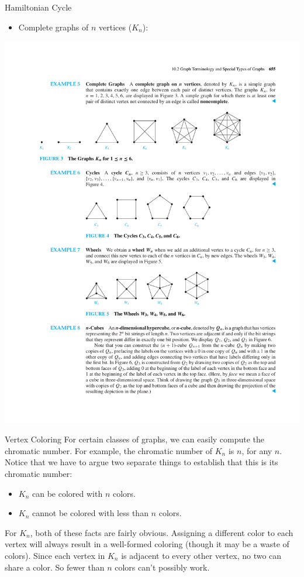 \documentclass{beamer}
\theoremstyle{definition}
\begin{document}
\begin{frame}{Hamiltonian Cycle}
   \begin{itemize}
        \item Complete graphs of $n$ vertices ($K_n$):
    \end{itemize}
    \centering \includegraphics[trim={2cm 20cm 7cm 5cm},clip,width=.9\linewidth]{p655}
\end{frame}

\begin{frame}{Vertex Coloring}
    For certain classes of graphs, we can easily compute the chromatic number. For example, the chromatic number of $K_n$ is $n$, for any $n$. Notice that we have to argue two separate things to establish that this is its chromatic number:
    \begin{itemize}
        \item $K_n$ can be colored with $n$ colors.
        \item $K_n$ cannot be colored with less than $n$ colors.
    \end{itemize}
    For $K_n$, both of these facts are fairly obvious. Assigning a different color to each vertex will always result in a well-formed coloring (though it may be a waste of colors). Since each vertex in $K_n$ is adjacent to every other vertex, no two can share a color. So fewer than $n$ colors can't possibly work.
\end{frame}
\end{document}

